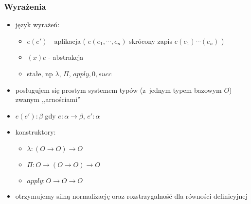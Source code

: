 \documentclass{beamer}
\begin{document}

\begin{frame}
\frametitle{Wyrażenia}

\begin{itemize}
\item język wyrażeń:
\begin{itemize}
\item $e(e')$ - aplikacja ( $e(e_1, \cdots, e_n)$ skrócony zapis $e(e_1)\cdots(e_n)$ )
\item $(x)e$ - abstrakcja
\item stałe, np $\lambda$, $\Pi$, $apply, 0, succ$
\end{itemize}

\end{itemize}

\pause

\begin{itemize}
\item posługujem się prostym systemem typów (z~jednym typem bazowym $O$) zwanym ,,arnościami''
\item $e(e') : \beta$ gdy $e : \alpha \to \beta$, $e' : \alpha$
\item konstruktory:
\begin{itemize}
\item $\lambda : (O \to O) \to O$
\item $\Pi: O \to (O \to O) \to O$
\item $apply : O\to O \to O$
\end{itemize}

\item otrzymujemy silną normalizację oraz rozstrzygalność dla równości definicyjnej
\end{itemize}


\end{frame}

\end{document}
